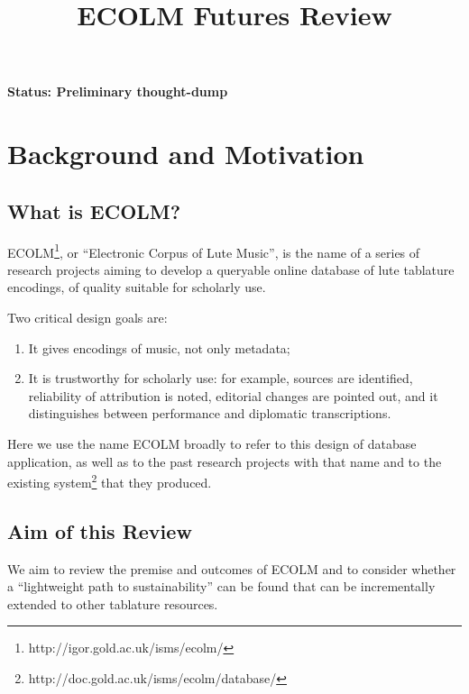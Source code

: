 \documentclass[9pt,twocolumn]{extarticle}
\begin{document}
\title{ECOLM Futures Review}

\maketitle
\begin{sloppypar}
  
  
  {\bf Status: Preliminary thought-dump}
  
  \section{Background and Motivation}

  \subsection{What is ECOLM?}

  ECOLM\footnote{http://igor.gold.ac.uk/isms/ecolm/}, or ``Electronic
  Corpus of Lute Music'', is the name of a series of research projects
  aiming to develop a queryable online database of lute tablature
  encodings, of quality suitable for scholarly use.

  Two critical design goals are:
  
  \begin{enumerate}
  \item It gives encodings of music, not only metadata;
  \item It is trustworthy for scholarly use: for example, sources are
    identified, reliability of attribution is noted, editorial changes
    are pointed out, and it distinguishes between performance and
    diplomatic transcriptions.
  \end{enumerate}
  
  Here we use the name ECOLM broadly to refer to this design of
  database application, as well as to the past research projects with
  that name and to the existing
  system\footnote{http://doc.gold.ac.uk/isms/ecolm/database/} that
  they produced.

  \subsection{Aim of this Review}

  We aim to review the premise and outcomes of ECOLM and to consider
  whether a ``lightweight path to sustainability'' can be found that
  can be incrementally extended to other tablature resources.


\end{sloppypar}
\end{document}

